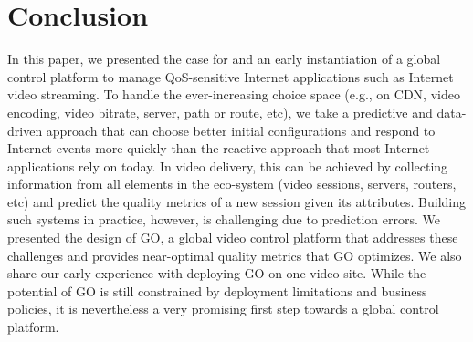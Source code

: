 \section{Conclusion}

In this paper, we presented the case for and an early instantiation of a global control platform to manage QoS-sensitive Internet applications 
such as Internet video streaming. To handle the ever-increasing choice space (e.g., on CDN, video encoding, video bitrate, server, path or route, etc), 
we take a predictive and data-driven approach that can choose better initial configurations and respond to Internet events more quickly than the reactive
approach that most Internet applications rely on today. In video delivery, this can be achieved by collecting information from all elements in the 
eco-system (video sessions, servers, routers, etc) and predict the quality metrics of a new session given its attributes.
Building such systems in practice, however, is challenging due to prediction errors.
We presented the design of GO, a global video control platform that addresses these challenges and provides near-optimal quality metrics that GO optimizes. 
We also share our early experience with deploying GO on one video site. 
While the potential of GO is still constrained by deployment limitations and business policies, 
it is nevertheless a very promising first step towards a global control platform.

